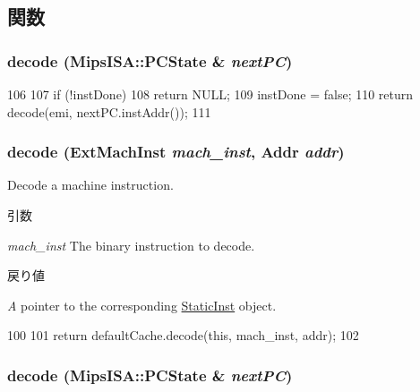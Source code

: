 \subsection{関数}
\hypertarget{classMipsISA_1_1Decoder_aafd5f445d783c8fe7f2ebbe211486a80}{
\subsubsection[{decode}]{ decode ({\bf MipsISA::PCState} \& {\em nextPC})}}
\label{classMipsISA_1_1Decoder_aafd5f445d783c8fe7f2ebbe211486a80}



\begin{DoxyCode}
106     {
107         if (!instDone)
108             return NULL;
109         instDone = false;
110         return decode(emi, nextPC.instAddr());
111     }
\end{DoxyCode}
\hypertarget{classMipsISA_1_1Decoder_a4ed948f8d08575cc2916fe32154ea69d}{
\subsubsection[{decode}]{ decode ({\bf ExtMachInst} {\em mach\_\-inst}, \/  {\bf Addr} {\em addr})}}
\label{classMipsISA_1_1Decoder_a4ed948f8d08575cc2916fe32154ea69d}
Decode a machine instruction. 
\begin{DoxyParams}{引数}
\item[{\em mach\_\-inst}]The binary instruction to decode. \end{DoxyParams}

\begin{DoxyRetVals}{戻り値}
\item[{\em A}]pointer to the corresponding \hyperlink{classStaticInst}{StaticInst} object. \end{DoxyRetVals}



\begin{DoxyCode}
100     {
101         return defaultCache.decode(this, mach_inst, addr);
102     }
\end{DoxyCode}
\hypertarget{classMipsISA_1_1Decoder_aafd5f445d783c8fe7f2ebbe211486a80}{
\subsubsection[{decode}]{ decode ({\bf MipsISA::PCState} \& {\em nextPC})}}
\label{classMipsISA_1_1Decoder_aafd5f445d783c8fe7f2ebbe211486a80}



